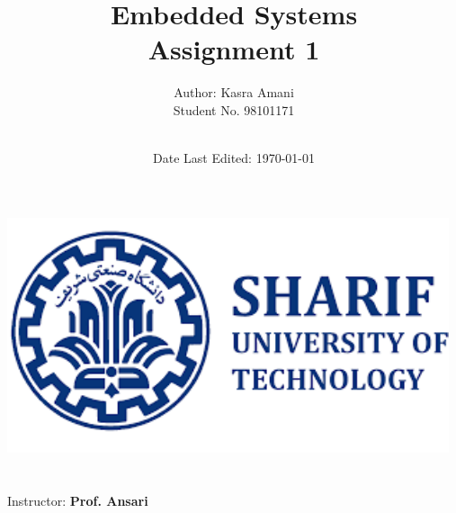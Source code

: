 \title{\Large Embedded Systems  \\[0.5cm]
        \bf\Large Assignment 1}
\author{\large Author: Kasra Amani\\ \normalsize Student No. 98101171 \\ \ \\}
\date{\large Date Last Edited: \today}

\makeatletter
    \begin{titlepage}
        \begin{center}
	   { \includegraphics[width=13cm]{sharif.png}}
	   {\ \\ \ \\}
        \vbox{}\vspace{5cm}
            {\@title }\\[3cm] 
            {\@author}
            {\large Instructor: \bf Prof. Ansari\\ \ \\}
            {\@date\\}

        \end{center}
    \end{titlepage}
\makeatother